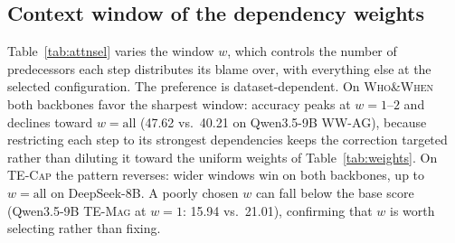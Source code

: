 %

\subsection{Context window of the dependency weights}
\label{app:window}


Table~\ref{tab:attnsel} varies the window $w$, which controls the number of predecessors each step distributes its blame over, with everything else at the selected configuration. The preference is dataset-dependent. On \textsc{Who\&When} both backbones favor the sharpest window: accuracy peaks at $w{=}1$--$2$ and declines toward $w{=}\text{all}$ (47.62 vs.\ 40.21 on Qwen3.5-9B \textsc{WW-AG}), because restricting each step to its strongest dependencies keeps the correction targeted rather than diluting it toward the uniform weights of Table~\ref{tab:weights}. On \textsc{TE-Cap} the pattern reverses: wider windows win on both backbones, up to $w{=}\text{all}$ on DeepSeek-8B. A poorly chosen $w$ can fall below the base score (Qwen3.5-9B \textsc{TE-Mag} at $w{=}1$: 15.94 vs.\ 21.01), confirming that $w$ is worth selecting rather than fixing.


